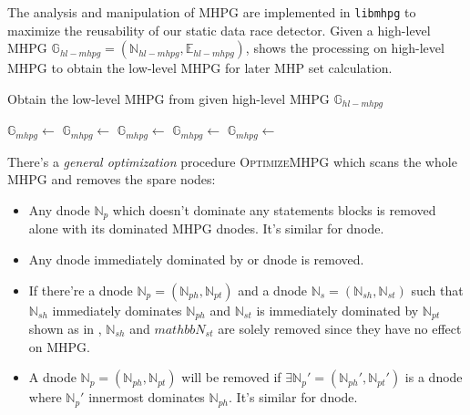 The analysis and manipulation of MHPG are implemented in \texttt{libmhpg} to maximize the reusability of our static data race detector. Given a high-level MHPG $\mathbb{G}_{hl-mhpg} = (\mathbb{N}_{hl-mhpg}, \mathbb{E}_{hl-mhpg})$,  shows the processing on high-level MHPG to obtain the low-level MHPG for later MHP set calculation.
\begin{algorithm}
	\caption{Obtain the low-level MHPG from given high-level MHPG $\mathbb{G}_{hl-mhpg}$}
	\label{a:low-level-mhpg-pseudocode}
	\begin{algorithmic}[1]
		\State $\mathbb{G}_{mhpg} \gets$ 
		\State $\mathbb{G}_{mhpg} \gets$ 
		\State $\mathbb{G}_{mhpg} \gets$ 
		\State $\mathbb{G}_{mhpg} \gets$ 
		\State $\mathbb{G}_{mhpg} \gets$ 
	\end{algorithmic}
\end{algorithm}

There's a \textit{general optimization} procedure \textsc{OptimizeMHPG} which scans the whole MHPG and removes the spare nodes:
\begin{itemize}
	\item Any  dnode $\mathbb{N}_{p}$ which doesn't dominate any statements blocks is removed alone with its dominated MHPG dnodes. It's similar for  dnode.
	\item Any  dnode immediately dominated by  or  dnode is removed.
	\item If there're a  dnode $\mathbb{N}_{p} = (\mathbb{N}_{ph}, \mathbb{N}_{pt})$ and a  dnode $\mathbb{N}_{s} = (\mathbb{N}_{sh}, \mathbb{N}_{st})$ such that $\mathbb{N}_{sh}$ immediately dominates $\mathbb{N}_{ph}$ and $\mathbb{N}_{st}$ is immediately dominated by $\mathbb{N}_{pt}$ shown as in , $\mathbb{N}_{sh}$ and $mathbb{N}_{st}$ are solely removed since they have no effect on MHPG.
	\item A  dnode $\mathbb{N}_{p} = (\mathbb{N}_{ph}, \mathbb{N}_{pt})$ will be removed if $\exists \mathbb{N}_{p}' = (\mathbb{N}_{ph}', \mathbb{N}_{pt}')$ is a  dnode where $\mathbb{N}_{p}'$ innermost dominates $\mathbb{N}_{ph}$. It's similar for  dnode.
\end{itemize}

